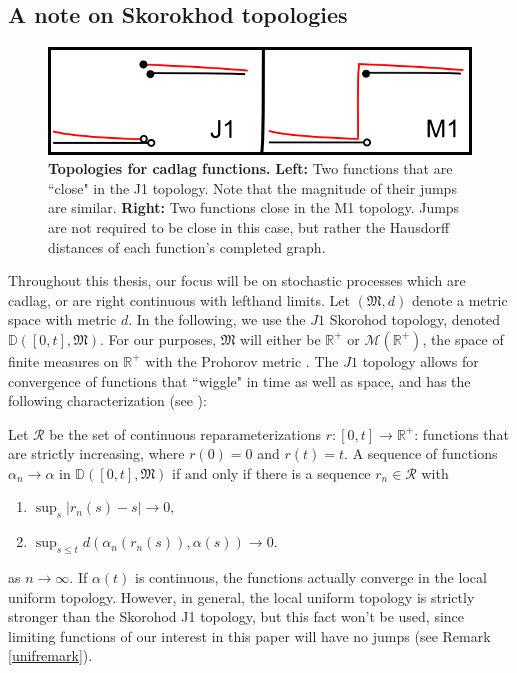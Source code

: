 \subsection{A note on Skorokhod topologies} \label{j1m1}

\begin{figure}
\begin{centering}
\includegraphics[width=.5\textwidth]{j1m1tops.png}
\caption{\textbf{Topologies for cadlag functions.} \textbf{Left:} Two functions that are ``close" in the J1 topology.  Note that the magnitude of their jumps are similar. \textbf{Right:} Two functions close in the M1 topology.  Jumps are not required to be close in this case, but rather the Hausdorff distances of each function's completed graph. }\label{j1m1}
\end{centering}
\end{figure}

Throughout this thesis, our focus will be on stochastic processes which are cadlag, or are right continuous with lefthand limits. Let $(\mathfrak M,d)$ denote a metric space with metric $d$.   In the following, we use the $J1$ Skorohod topology, denoted $\mathbb D([0,t],\mathfrak M)$. For our purposes, $\mathfrak M$ will either be $\mathbb{R}^+$ or  $\mathcal M(\mathbb{R}^+)$, the space of finite measures on $\mathbb{R}^+$ with the Prohorov metric \cite{billingsley2009convergence}.
The $J1$ topology  allows for convergence of functions that ``wiggle" in time as well as space, and has  the following characterization (see \cite{jac87}): 

Let $\mathscr R$ be the set of continuous reparameterizations $r: [0,t]\rightarrow \mathbb{R}^+$: functions that are strictly increasing, where $r(0) = 0$ and $r(t)=t$.  A sequence of functions $\alpha_n \rightarrow \alpha$ in $\mathbb{D}([0,t],\mathfrak M)$ if and only if there is a sequence $r_n \in \mathscr R$ with 

\begin{enumerate}
\item $\sup_s |r_n(s)-s| \rightarrow 0,$
\item $\sup_{s \le t} d(\alpha_n(r_n(s)), \alpha(s)) \rightarrow 0.$ 
\end{enumerate}
as $n \rightarrow \infty$. If $\alpha(t)$ is continuous, the functions actually converge in the local uniform topology. However, in general,  the local uniform topology is strictly stronger than the Skorohod J1 topology, but this fact won't be used, since limiting functions of our interest in this paper will have no jumps (see Remark \ref{unifremark}).  



